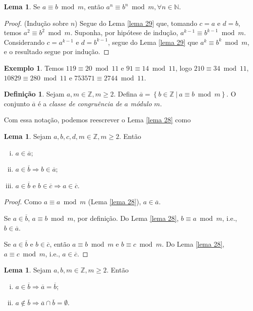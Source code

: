 \documentclass[a4paper,11pt,twoside, leqno]{article}
\theoremstyle{definition}
\newtheorem*{definition}{Definição}
\newtheorem{lemma}[theorem]{Lema}
\newtheorem*{example}{Exemplo}
\begin{document}
\begin{lemma}
	\label{lema 30}
	Se $a\equiv b\bmod m$, então $a^n\equiv b^n\bmod m, \forall n\in\mathbb{N}$.
\end{lemma}
\begin{proof}
	(Indução sobre $n$) Segue do Lema \eqref{lema 29} que, tomando $c = a$ e $d = b$, temos $a^2\equiv b^2\bmod m$. Suponha, por hipótese de indução, $a^{k-1}\equiv b^{k-1}\bmod m$. Considerando $c = a^{k-1}$ e $d = b^{k-1}$, segue do Lema \eqref{lema 29} que $a^k\equiv b^k\bmod m$, e o resultado segue por indução.
\end{proof}
\begin{example}
	Temos $119\equiv 20\bmod 11$ e $91\equiv 14\bmod 11$, logo $210\equiv 34\bmod 11$, $10829\equiv 280\bmod 11$ e $753571\equiv 2744\bmod 11$.
\end{example}
\begin{definition}
	\label{classe congruencia}
	Sejam $a,m\in\mathbb{Z}, m\geq 2$. Defina $\overline{a} = \left\{ b\in\mathbb{Z}\ | \ a\equiv b\bmod m \right\}$. O conjunto $\overline{a}$ é a {\em classe de congruência de $a$ módulo $m$}.
\end{definition}
Com essa notação, podemos reescrever o Lema \eqref{lema 28} como
\begin{lemma}
	\label{lema 31}
	Sejam $a,b,c,d,m\in\mathbb{Z}, m\geq 2$. Então
	\begin{enumerate}[(i)]
		\item $a\in\overline{a}$;
		\item $a\in\overline{b} \Rightarrow b\in\overline{a}$;
		\item $a\in\overline{b}$ e $b\in\overline{c} \Rightarrow a\in\overline{c}$.
	\end{enumerate}
\end{lemma}
\begin{proof}
	Como $a\equiv a\bmod m$ (Lema \eqref{lema 28}), $a\in\overline{a}$.
	
	Se $a\in\overline{b}$, $a\equiv b\bmod m$, por definição. Do Lema \eqref{lema 28}, $b\equiv a\bmod m$, i.e., $b\in\overline{a}$.
	
	Se $a\in\overline{b}$ e $b\in\overline{c}$, então $a\equiv b\bmod m$ e $b\equiv c\bmod m$. Do Lema \eqref{lema 28}, $a\equiv c\bmod m$, i.e., $a\in\overline{c}$.
\end{proof}
\begin{lemma}
	\label{lema 32}
	Sejam $a,b,m\in\mathbb{Z}, m\geq 2$. Então
	\begin{enumerate}[(i)]
		\item $a\in\overline{b}\Rightarrow \overline{a} = \overline{b}$;
		\item $a\notin\overline{b} \Rightarrow \overline{a}\cap\overline{b} = \emptyset$.
	\end{enumerate}
\end{lemma}
\end{document}
